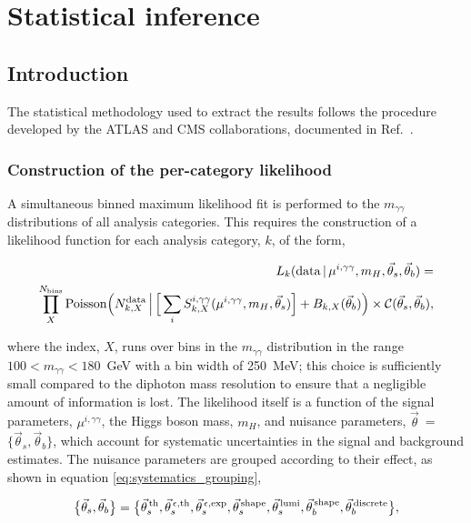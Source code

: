 \chapter{Statistical inference}
\label{chap:hgg_stats}

\section{Introduction}
The statistical methodology used to extract the results follows the procedure developed by the ATLAS and CMS collaborations, documented in Ref.~\cite{Khachatryan:2014jba}. 

\subsection{Construction of the per-category likelihood}\label{sec:category_likelihood}
A simultaneous binned maximum likelihood fit is performed to the $m_{\gamma\gamma}$ distributions of all analysis categories. This requires the construction of a likelihood function for each analysis category, $k$, of the form,

\begin{equation}\label{eq:category_likelihood}
\begin{split}
    L_k({\rm{data}}\,|\,\mu^{i,\gamma\gamma},m_H,\vec{\theta}_s,\vec{\theta}_b) = \\
    \prod^{N_{\rm{bins}}}_{X} {\rm{Poisson}} \Big( N_{k,X}^{\rm{data}} \, \Big| \, \Big[ \sum_{i} S_{k,X}^{i,\gamma\gamma}(\mu^{i,\gamma\gamma},m_H,\vec{\theta}_s)\Big] + B_{k,X}(\vec{\theta}_b) \Big) \times \mathcal{C}(\vec{\theta}_s,\vec{\theta}_b),        
\end{split}
\end{equation}

\noindent
where the index, $X$, runs over bins in the $m_{\gamma\gamma}$ distribution in the range $100<m_{\gamma\gamma}<180$~GeV with a bin width of 250~MeV; this choice is sufficiently small compared to the diphoton mass resolution to ensure that a negligible amount of information is lost. The likelihood itself is a function of the signal parameters, $\mu^{i,\gamma\gamma}$, the Higgs boson mass, $m_H$, and nuisance parameters, $\vec{\theta}$~=~$\{\vec{\theta}_s,\vec{\theta}_b\}$, which account for systematic uncertainties in the signal and background estimates. The nuisance parameters are grouped according to their effect, as shown in equation \ref{eq:systematics_grouping},

\begin{equation}\label{eq:systematics_grouping}
    \big\{\vec{\theta}_s,\vec{\theta}_b\big\} = \big\{ \vec{\theta}^{\,\rm{th}}_{s}, \vec{\theta}^{\,\epsilon,{\rm{th}}}_{s}, \vec{\theta}^{\,\epsilon,{\rm{exp}}}_{s}, \vec{\theta}^{\,\rm{shape}}_{s}, \vec{\theta}^{\,\rm{lumi}}_{s}, \vec{\theta}^{\,\rm{shape}}_{b}, \vec{\theta}^{\,\rm{discrete}}_{b}  \big\},
\end{equation}

